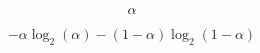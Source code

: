 \documentclass[10pt,twoside]{book}
\begin{document}
$$
\alpha
$$

$$
-\alpha \log_2( \alpha ) - (1-\alpha) \log_2( 1-\alpha )
$$
\end{document}
